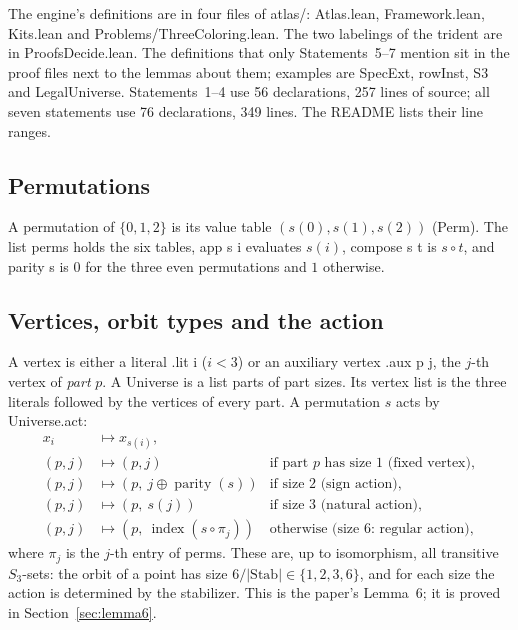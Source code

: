 \documentclass[11pt,a4paper]{article}
\newcommand{\leanus}{\textunderscore\allowbreak}
\newcommand{\lean}[1]{{\ttfamily\let\_\leanus #1}}
\theoremstyle{definition}
\begin{document}
The engine's definitions are in four files of \lean{atlas/}:
\lean{Atlas.lean}, \lean{Framework.lean}, \lean{Kits.lean} and
\lean{Problems/ThreeColoring.lean}. The two labelings of the trident are in
\lean{ProofsDecide.lean}. The definitions that only Statements~5--7 mention
sit in the proof files next to the lemmas about them; examples are
\lean{SpecExt}, \lean{rowInst}, \lean{S3} and \lean{LegalUniverse}.
Statements~1--4 use 56 declarations, 257 lines of source; all seven
statements use 76 declarations, 349 lines. The README lists their line
ranges.

\subsection{Permutations}
A permutation of $\{0,1,2\}$ is its value table $(s(0),s(1),s(2))$
(\lean{Perm}). The list \lean{perms} holds the six tables,
\lean{app s i} evaluates $s(i)$, \lean{compose s t} is $s\circ t$, and
\lean{parity s} is $0$ for the three even permutations and $1$ otherwise.

\subsection{Vertices, orbit types and the action}\label{sec:action}
A vertex is either a literal \lean{.lit i} ($i<3$) or an auxiliary vertex
\lean{.aux p j}, the $j$-th vertex of \emph{part} $p$. A \lean{Universe} is a
list \lean{parts} of part sizes. Its vertex list is the three literals
followed by the vertices of every part. A permutation $s$ acts by
\lean{Universe.act}:
\[
\begin{array}{lll}
x_i &\mapsto x_{s(i)}, & \\
(p,j) &\mapsto (p,j) & \text{if part $p$ has size 1 (fixed vertex)},\\
(p,j) &\mapsto (p,\ j\oplus \operatorname{parity}(s)) & \text{if size 2 (sign action)},\\
(p,j) &\mapsto (p,\ s(j)) & \text{if size 3 (natural action)},\\
(p,j) &\mapsto (p,\ \operatorname{index}(s\circ \pi_j)) & \text{otherwise (size 6: regular action)},
\end{array}
\]
where $\pi_j$ is the $j$-th entry of \lean{perms}. These are, up to
isomorphism, all transitive $S_3$-sets: the orbit of a point has size
$6/|\mathrm{Stab}|\in\{1,2,3,6\}$, and for each size the action is
determined by the stabilizer. This is the paper's Lemma~6; it is proved in
Section~\ref{sec:lemma6}.
\end{document}
